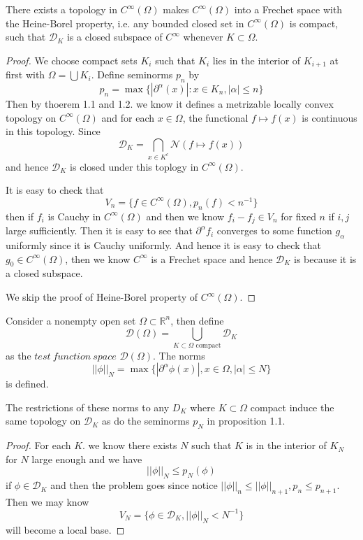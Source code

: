 \documentclass[lang=en, color=blue, ]{elegantbook}
\newcommand{\R}{\mathbb{R}}
\newcommand{\D}{\mathscr{D}}
\begin{document}
\begin{proposition}
    There exists a topology in $C^{\infty}(\Omega)$ makes $C^{\infty}(\Omega)$ into a Frechet space with the Heine-Borel property, i.e. any bounded closed set in $C^{\infty}(\Omega)$ is compact, such that $\D_K$ is a closed subspace of $C^{\infty}$ whenever $K\subset\Omega$.
\end{proposition}
\begin{proof}\par
    We choose compact sets $K_i$ such that $K_i$ lies in the interior of $K_{i+1}$ at first with $\Omega = \bigcup K_i$. Define seminorms $p_n$ by
    \[
    p_n = \max\{|\partial^{\alpha}(x)|:x\in K_n, |\alpha| \leq n\}
    \]
    Then by thoerem 1.1 and 1.2. we know it defines a metrizable locally convex topology on $C^{\infty}(\Omega)$ and for each $x\in\Omega$, the functional $f\mapsto f(x)$ is continuous in this topology. Since
    \[\D_K = \bigcap_{x\in K^c}\mathcal{N}(f\mapsto f(x))\]
    and hence $\D_K$ is closed under this toplogy in $C^{\infty}(\Omega)$.\par
    It is easy to check that
    \[
    V_n = \{f\in C^{\infty}(\Omega), p_n(f)<n^{-1}\}
    \]
    then if $f_i$ is Cauchy in $C^{\infty}(\Omega)$ and then we know $f_i - f_j \in V_n$ for fixed $n$ if $i,j$ large sufficiently. Then it is easy to see that $\partial^{\alpha} f_i$ converges to some function $g_{\alpha}$ uniformly since it is Cauchy uniformly. And hence it is easy to check that $g_0\in C^{\infty}(\Omega)$, then we know $C^{\infty}$ is a Frechet space and hence $\D_K$ is because it is a closed subspace.\par
    We skip the proof of Heine-Borel property of $C^{\infty}(\Omega)$.
\end{proof}

\begin{definition}
    Consider a nonempty open set $\Omega \subset \R^n$, then define
    \[\D(\Omega) = \bigcup_{K\subset \Omega\text{ compact}} \D_K\]
    as the $test\ function\ space$ $\D(\Omega)$. The norms
    \[||\phi||_N = \max\{|\partial^{\alpha}\phi(x)|, x\in \Omega, |\alpha| \leq N\}\]
    is defined.
\end{definition}

\begin{proposition}
    The restrictions of these norms to any $D_K$ where $K\subset \Omega$ compact induce the same topology on $\D_K$ as do the seminorms $p_N$ in proposition 1.1.
\end{proposition}
\begin{proof}\par
    For each $K$. we know there exists $N$ such that $K$ is in the interior of $K_N$ for $N$ large enough and we have
    \[
    ||\phi||_N \leq p_N(\phi)
    \]
    if $\phi\in\D_K$ and then the problem goes since notice $||\phi||_n \leq ||\phi||_{n+1}, p_n \leq p_{n+1}$. Then we may know
    \[
    V_N = \{\phi\in\D_K, ||\phi||_N < N^{-1}\}
    \]
    will become a local base.
\end{proof}
\end{document}
